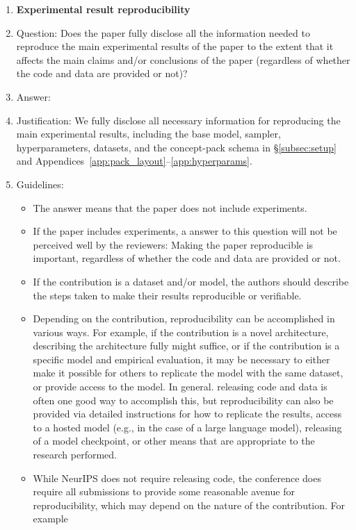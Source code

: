 \begin{enumerate}
    \item {\bf Experimental result reproducibility}
    \item[] Question: Does the paper fully disclose all the information needed to reproduce the main experimental results of the paper to the extent that it affects the main claims and/or conclusions of the paper (regardless of whether the code and data are provided or not)?
    \item[] Answer: \answerYes{}
    \item[] Justification: We fully disclose all necessary information for reproducing the main experimental results, including the base model, sampler, hyperparameters, datasets, and the concept-pack schema in \S\ref{subsec:setup} and Appendices~\ref{app:pack_layout}--\ref{app:hyperparams}.
    \item[] Guidelines:
    \begin{itemize}
        \item The answer \answerNA{} means that the paper does not include experiments.
        \item If the paper includes experiments, a \answerNo{} answer to this question will not be perceived well by the reviewers: Making the paper reproducible is important, regardless of whether the code and data are provided or not.
        \item If the contribution is a dataset and\slash or model, the authors should describe the steps taken to make their results reproducible or verifiable.
        \item Depending on the contribution, reproducibility can be accomplished in various ways. For example, if the contribution is a novel architecture, describing the architecture fully might suffice, or if the contribution is a specific model and empirical evaluation, it may be necessary to either make it possible for others to replicate the model with the same dataset, or provide access to the model. In general. releasing code and data is often one good way to accomplish this, but reproducibility can also be provided via detailed instructions for how to replicate the results, access to a hosted model (e.g., in the case of a large language model), releasing of a model checkpoint, or other means that are appropriate to the research performed.
        \item While NeurIPS does not require releasing code, the conference does require all submissions to provide some reasonable avenue for reproducibility, which may depend on the nature of the contribution. For example

\end{itemize}
\end{enumerate}
